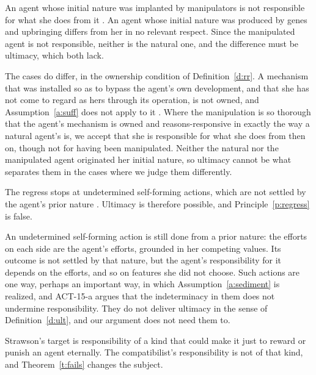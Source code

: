 \documentclass{situationist-preprint}
\begin{document}
\begin{objection}[Manipulation]
An agent whose initial nature was implanted by manipulators is not responsible for what she does from it \citep{Pereboom2001}. An agent whose initial nature was produced by genes and upbringing differs from her in no relevant respect. Since the manipulated agent is not responsible, neither is the natural one, and the difference must be ultimacy, which both lack.
\end{objection}

\begin{reply}
The cases do differ, in the ownership condition of Definition~\ref{d:rr}. A mechanism that was installed so as to bypass the agent's own development, and that she has not come to regard as hers through its operation, is not owned, and Assumption~\ref{a:suff} does not apply to it \citep{FischerRavizza1998}. Where the manipulation is so thorough that the agent's mechanism is owned and reasons-responsive in exactly the way a natural agent's is, we accept that she is responsible for what she does from then on, though not for having been manipulated. Neither the natural nor the manipulated agent originated her initial nature, so ultimacy cannot be what separates them in the cases where we judge them differently.
\end{reply}

\begin{objection}
The regress stops at undetermined self-forming actions, which are not settled by the agent's prior nature \citep{Kane1996}. Ultimacy is therefore possible, and Principle~\ref{p:regress} is false.
\end{objection}

\begin{reply}
An undetermined self-forming action is still done from a prior nature: the efforts on each side are the agent's efforts, grounded in her competing values. Its outcome is not settled by that nature, but the agent's responsibility for it depends on the efforts, and so on features she did not choose. Such actions are one way, perhaps an important way, in which Assumption~\ref{a:sediment} is realized, and ACT-15-a argues that the indeterminacy in them does not undermine responsibility. They do not deliver ultimacy in the sense of Definition~\ref{d:ult}, and our argument does not need them to.
\end{reply}

\begin{objection}
Strawson's target is responsibility of a kind that could make it just to reward or punish an agent eternally. The compatibilist's responsibility is not of that kind, and Theorem~\ref{t:fails} changes the subject.
\end{objection}
\end{document}
